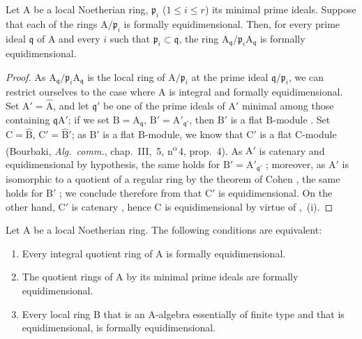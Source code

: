 \begin{lemma}[7.1.7]
\label{IV.7.1.7}
Let $\mathrm{A}$ be a local Noetherian ring, $\mathfrak{p}_i$ ($1\leqslant i\leqslant r$) its minimal prime ideals.
Suppose that each of the rings $\mathrm{A}/\mathfrak{p}_i$ is formally equidimensional.
Then, for every prime ideal $\mathfrak{q}$ of $\mathrm{A}$ and every $i$ such that $\mathfrak{p}_i\subset\mathfrak{q}$, the ring $\mathrm{A}_\mathfrak{q}/\mathfrak{p}_i\mathrm{A}_\mathfrak{q}$ is formally equidimensional.
\end{lemma}

\begin{proof}
As $\mathrm{A}_\mathfrak{q}/\mathfrak{p}_i\mathrm{A}_\mathfrak{q}$ is the local ring of $\mathrm{A}/\mathfrak{p}_i$ at the prime ideal $\mathfrak{q}/\mathfrak{p}_i$, we can restrict ourselves to the case where $\mathrm{A}$ is integral and formally equidimensional.
Set $\mathrm{A}'=\widehat{\mathrm{A}}$, and let $\mathfrak{q}'$ be one of the prime ideals of $\mathrm{A}'$ minimal among those containing $\mathfrak{q}\mathrm{A}'$; if we set $\mathrm{B}=\mathrm{A}_\mathfrak{q}$, $\mathrm{B}'=\mathrm{A}'_{\mathfrak{q}'}$, then $\mathrm{B}'$ is a flat $\mathrm{B}$-module .
Set $\mathrm{C}=\widehat{\mathrm{B}}$, $\mathrm{C}'=\widehat{\mathrm{B}}'$; as $\mathrm{B}'$ is a flat $\mathrm{B}$-module, we know that $\mathrm{C}'$ is a flat $\mathrm{C}$-module (Bourbaki, \emph{Alg.\ comm.}, chap.~III, \textsection\,5, n\textsuperscript{o}\,4, prop.~4).
As $\mathrm{A}'$ is catenary  and equidimensional by hypothesis, the same holds for $\mathrm{B}'=\mathrm{A}'_{\mathfrak{q}'}$ ; moreover, as $\mathrm{A}'$ is isomorphic to a quotient of a regular ring by the theorem of Cohen , the same holds for $\mathrm{B}'$ ; we conclude therefore from  that $\mathrm{C}'$ is equidimensional.
On the other hand, $\mathrm{C}'$ is catenary , hence $\mathrm{C}$ is equidimensional by virtue of ,~(i).
\end{proof}

\begin{theorem}[7.1.8]
\label{IV.7.1.8}
Let $\mathrm{A}$ be a local Noetherian ring.
The following conditions are equivalent:
\begin{enumerate}[label=\emph{\alph*)}]
  \item Every integral quotient ring of $\mathrm{A}$ is formally equidimensional.
  \item The quotient rings of $\mathrm{A}$ by its minimal prime ideals are formally equidimensional.
  \item Every local ring $\mathrm{B}$ that is an A-algebra essentially of finite type  and that is equidimensional, is formally equidimensional.
\end{enumerate}
\end{theorem}

